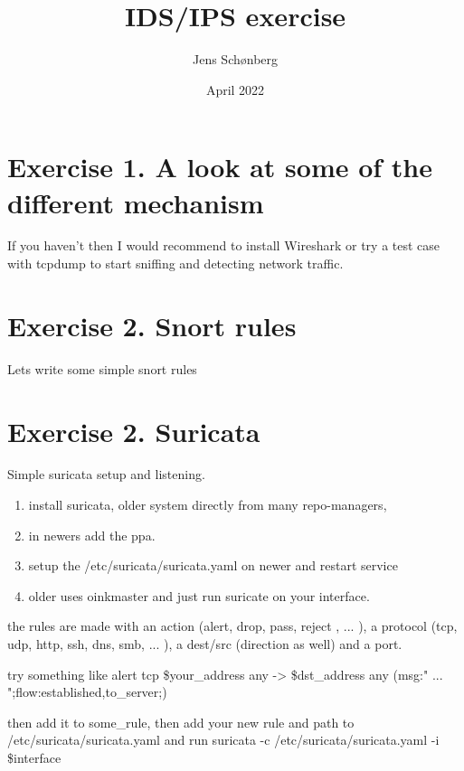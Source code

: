 \documentclass[12pt, letterpaper, twoside]{article}
\title{IDS/IPS exercise}
\author{Jens Schønberg}
\date{April 2022}
\begin{document}
\begin{titlepage}
\maketitle
\end{titlepage}

\section{Exercise 1. A look at some of the different mechanism}
If you haven't then I would recommend to install Wireshark or try a test case with tcpdump to start sniffing and detecting network traffic.


\section{Exercise 2. Snort rules}
Lets write some simple snort rules

\section{Exercise 2. Suricata}
Simple suricata setup and listening.
\begin{enumerate}
	\item install suricata, older system directly from many repo-managers,
	\item in newers add the ppa.
	\item setup the /etc/suricata/suricata.yaml on newer and restart service
	\item older uses oinkmaster and just run suricate on your interface.
\end{enumerate}

the rules are made with an action (alert, drop, pass, reject , ... ), a protocol (tcp, udp, http, ssh, dns, smb, ... ), a dest/src (direction as well) and a port.

try something like alert tcp \$your\_address any -> \$dst\_address any (msg:" ... ";flow:established,to\_server;)

then add it to some\_rule, then add your new rule and path to /etc/suricata/suricata.yaml and run suricata -c /etc/suricata/suricata.yaml -i \$interface
\end{document}
